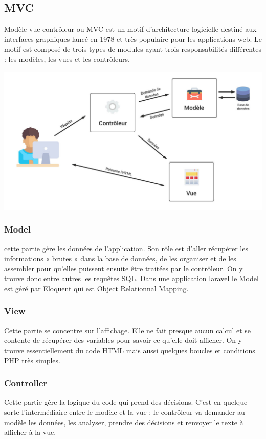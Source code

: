 		\subsection*{MVC}
			Modèle-vue-contrôleur ou MVC est un motif d'architecture logicielle destiné aux interfaces graphiques lancé en 1978 et très populaire pour les applications web. Le motif est composé de trois types de modules ayant trois responsabilités différentes : les modèles, les vues et les contrôleurs.
				
				\begin{center}
					\includegraphics[scale=0.5]{chap_2/mvc.png}
					\label{logo de MVC}
					\cite{logo_mvc}
				\end{center}
				
			\subsubsection{Model}
				cette partie gère les données de l'application. Son rôle est d'aller récupérer les informations « brutes » dans la base de données, de les organiser et de les assembler pour qu'elles puissent ensuite être traitées par le contrôleur. On y trouve donc entre autres les requêtes SQL\cite{mvc_model}. Dans une application laravel le Model est géré par Eloquent qui est Object Relationnal Mapping.
			\subsubsection{View}
				 Cette partie se concentre sur l'affichage. Elle ne fait presque aucun calcul et se contente de récupérer des variables pour savoir ce qu'elle doit afficher. On y trouve essentiellement du code HTML mais aussi quelques boucles et conditions PHP très simples.
			\subsubsection{Controller}
				Cette partie gère la logique du code qui prend des décisions. C'est en quelque sorte l'intermédiaire entre le modèle et la vue : le contrôleur va demander au modèle les données, les analyser, prendre des décisions et renvoyer le texte à afficher à la vue.
